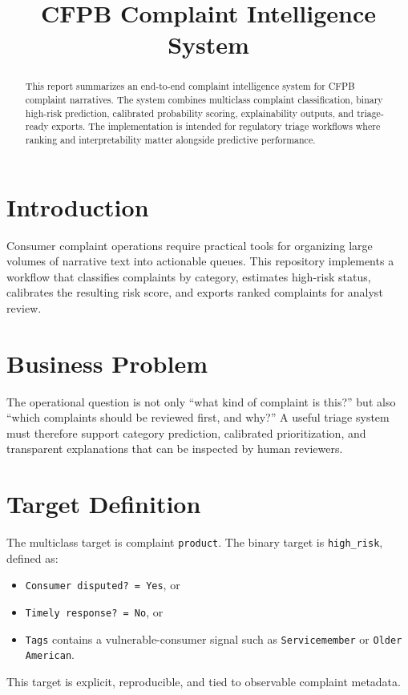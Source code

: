 \documentclass[11pt]{article}
\title{CFPB Complaint Intelligence System}
\author{}
\date{}
\begin{document}
\maketitle

\begin{abstract}
This report summarizes an end-to-end complaint intelligence system for CFPB complaint narratives. The system combines multiclass complaint classification, binary high-risk prediction, calibrated probability scoring, explainability outputs, and triage-ready exports. The implementation is intended for regulatory triage workflows where ranking and interpretability matter alongside predictive performance.
\end{abstract}

\section{Introduction}
Consumer complaint operations require practical tools for organizing large volumes of narrative text into actionable queues. This repository implements a workflow that classifies complaints by category, estimates high-risk status, calibrates the resulting risk score, and exports ranked complaints for analyst review.

\section{Business Problem}
The operational question is not only ``what kind of complaint is this?'' but also ``which complaints should be reviewed first, and why?'' A useful triage system must therefore support category prediction, calibrated prioritization, and transparent explanations that can be inspected by human reviewers.

\section{Target Definition}
The multiclass target is complaint \texttt{product}. The binary target is \texttt{high\_risk}, defined as:
\begin{itemize}
\item \texttt{Consumer disputed? = Yes}, or
\item \texttt{Timely response? = No}, or
\item \texttt{Tags} contains a vulnerable-consumer signal such as \texttt{Servicemember} or \texttt{Older American}.
\end{itemize}
This target is explicit, reproducible, and tied to observable complaint metadata.
\end{document}
